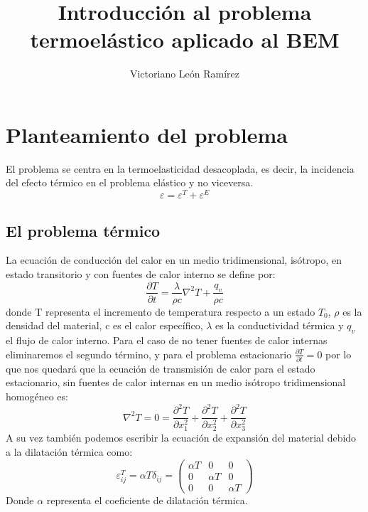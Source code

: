 \documentclass[11pt,a4paper]{article}
\author{Victoriano León Ramírez}
\title{Introducción al problema termoelástico aplicado al BEM}
\begin{document}
\maketitle
\section{Planteamiento del problema}
El problema se centra en la termoelasticidad desacoplada, es decir, la incidencia del efecto térmico en el problema elástico y no viceversa. \\
\begin{equation}
 \varepsilon =\varepsilon^{T} +\varepsilon^{E}
 \end{equation}
 \label{hookecalor}
\subsection{El problema térmico}
La ecuación de conducción del calor en un medio tridimensional, isótropo, en estado transitorio y con fuentes de calor interno se define por:
\begin{equation}
\frac{\partial{T}}{\partial{t}}=\frac{\lambda}{\rho c} \nabla^{2} T + \frac{q_{v}}{\rho c}
\end{equation}
donde T representa el incremento de temperatura respecto a un estado $T_{0}$, $\rho$ es la densidad del material, c es el calor específico, $\lambda$ es la conductividad térmica y $q_{v}$ el flujo de calor interno.
Para el caso de no tener fuentes de calor internas eliminaremos el segundo término, y para el problema estacionario $\frac{\partial{T}}{\partial{t}}=0$ por lo que nos quedará que la ecuación de transmisión de calor para el estado estacionario, sin fuentes de calor internas en un medio isótropo tridimensional homogéneo es:
\begin{equation}
\nabla^{2}T=0= \frac{\partial^{2}T}{\partial{x_1^{2}}} +\frac{\partial^{2}T}{\partial{x_2^{2}}} +\frac{\partial^{2}T}{\partial{x_3^{2}}}
\end{equation}
A su vez también podemos escribir la ecuación de expansión del material debido a la dilatación térmica como:
\begin{equation}
\varepsilon^{T}_{ij}=\alpha T \delta_{ij}= \left( \begin{array}{ccc}
\alpha T & 0 & 0 \\
0 & \alpha T & 0\\
0 & 0 & \alpha T \end{array} \right)
\end{equation}
Donde $\alpha$ representa el coeficiente de dilatación térmica.
\end{document}
